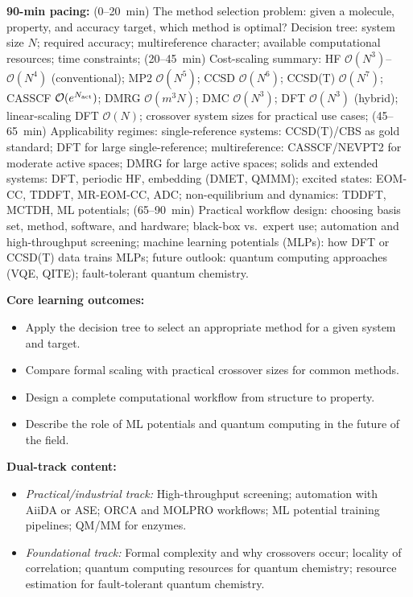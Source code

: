 \documentclass[11pt,a4paper]{article}
\begin{document}
\begin{tcolorbox}[modulebox, title={Module~II.1 --- Lecture L12: Method Selection in Practice}]
\textbf{90-min pacing:} (0--20~min) The method selection problem: given a molecule, property,
and accuracy target, which method is optimal?
Decision tree: system size $N$; required accuracy; multireference character;
available computational resources; time constraints;
(20--45~min) Cost-scaling summary: HF $\mathcal{O}(N^3)$--$\mathcal{O}(N^4)$ (conventional);
MP2 $\mathcal{O}(N^5)$; CCSD $\mathcal{O}(N^6)$; CCSD(T) $\mathcal{O}(N^7)$;
CASSCF $\mathcal{O}(e^{N_{\rm act}})$; DMRG $\mathcal{O}(m^3 N)$; DMC $\mathcal{O}(N^3)$;
DFT $\mathcal{O}(N^3)$ (hybrid); linear-scaling DFT $\mathcal{O}(N)$;
crossover system sizes for practical use cases;
(45--65~min) Applicability regimes:
single-reference systems: CCSD(T)/CBS as gold standard; DFT for large single-reference;
multireference: CASSCF/NEVPT2 for moderate active spaces; DMRG for large active spaces;
solids and extended systems: DFT, periodic HF, embedding (DMET, QMMM);
excited states: EOM-CC, TDDFT, MR-EOM-CC, ADC;
non-equilibrium and dynamics: TDDFT, MCTDH, ML potentials;
(65--90~min) Practical workflow design: choosing basis set, method, software, and hardware;
black-box vs.\ expert use; automation and high-throughput screening;
machine learning potentials (MLPs): how DFT or CCSD(T) data trains MLPs;
future outlook: quantum computing approaches (VQE, QITE); fault-tolerant quantum chemistry.

\medskip\textbf{Core learning outcomes:}
\begin{itemize}[leftmargin=1.4em,topsep=2pt,itemsep=1pt]
  \item Apply the decision tree to select an appropriate method for a given system and target.
  \item Compare formal scaling with practical crossover sizes for common methods.
  \item Design a complete computational workflow from structure to property.
  \item Describe the role of ML potentials and quantum computing in the future of the field.
\end{itemize}

\medskip\textbf{Dual-track content:}
\begin{itemize}[leftmargin=1.4em,topsep=2pt,itemsep=1pt]
  \item \textit{Practical/industrial track:} High-throughput screening; automation with AiiDA
    or ASE; ORCA and MOLPRO workflows; ML potential training pipelines; QM/MM for enzymes.
  \item \textit{Foundational track:} Formal complexity and why crossovers occur;
    locality of correlation; quantum computing resources for quantum chemistry;
    resource estimation for fault-tolerant quantum chemistry.
\end{itemize}


\end{tcolorbox}
\end{document}
